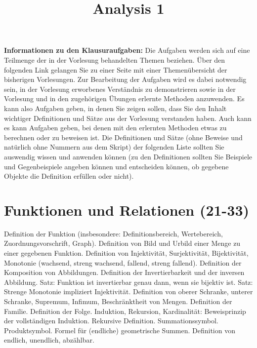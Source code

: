 \documentclass[10pt,a4paper,twoside]{article}
\title{Analysis 1}
\begin{document}
\pagestyle{fancy}
\setcounter{page}{1}
\maketitle

\textbf{Informationen zu den Klausuraufgaben:} Die Aufgaben werden sich auf eine Teilmenge der in der Vorlesung behandelten Themen beziehen. Über den folgenden Link gelangen Sie zu einer Seite mit einer 
Themenübersicht der bisherigen Vorlesungen. 
Zur Bearbeitung der Aufgaben wird es dabei notwendig sein, in der Vorlesung erworbenes Verständnis zu demonstrieren sowie in der Vorlesung und in den zugehörigen Übungen erlernte Methoden anzuwenden. Es kann also Aufgaben geben, in denen Sie zeigen sollen, dass Sie den Inhalt wichtiger Definitionen und Sätze aus der Vorlesung verstanden haben. Auch kann es kann Aufgaben geben, bei denen mit den erlernten Methoden etwas zu berechnen oder zu beweisen ist. Die Definitionen und Sätze (ohne Beweise und natürlich ohne Nummern aus dem Skript) der folgenden Liste sollten Sie auswendig wissen und anwenden können (zu den Definitionen sollten Sie Beispiele und Gegenbeispiele angeben können und entscheiden können, ob gegebene Objekte die Definition erfüllen oder nicht). 

\tableofcontents
\cleardoublepage

\setcounter{page}{1}
\fancyhead[LE,RO]{\rightmark}
\fancyhead[LO,RE]{\leftmark}
\fancyfoot[LE,RO]{\thepage}



\section{Funktionen und Relationen (21-33)}
  
Definition der Funktion (insbesondere: Definitionsbereich, Wertebereich, Zuordnungsvorschrift, Graph). Definition von Bild und Urbild einer Menge zu einer gegebenen Funktion. Definition von Injektivität, Surjektivität, Bijektivität, Monotonie (wachsend, streng wachsend, fallend, streng fallend). Definition der Komposition von Abbildungen. Definition der Invertierbarkeit und der inversen Abbildung. Satz: Funktion ist invertierbar genau dann, wenn sie bijektiv ist. Satz: Strenge Monotonie impliziert Injektivität. Definition von oberer Schranke, unterer Schranke, Supremum, Infimum, Beschränktheit von Mengen. Definition der Familie. Definition der Folge. 
Induktion, Rekursion, Kardinalität: 
Beweisprinzip der vollständigen Induktion. Rekursive Definition. Summationssymbol. Produktsymbol. Formel für (endliche) geometrische Summen. Definition von endlich, unendlich, abzählbar. 
\end{document}
